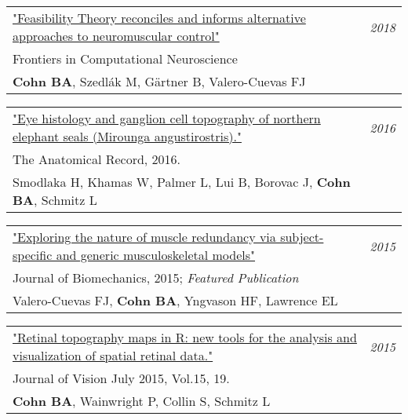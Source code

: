 \documentclass[10pt,a4paper]{article}
\begin{document}
\vspace*{1mm}\noindent\begin{tabularx}{17cm}{X r}
   \href{https://github.com/bc/resume/raw/master/papers/cohn_et_al_2018_frontiers.pdf}{"Feasibility Theory reconciles and informs alternative approaches to neuromuscular control"} & \textit{2018}\\
   Frontiers in Computational Neuroscience \\
	 \textbf{Cohn BA}, Szedl\'{a}k M, G{\"a}rtner B, Valero-Cuevas FJ \\[2mm]
\end{tabularx}


\vspace*{1mm}\noindent\begin{tabularx}{17cm}{X r}
    \href{smodlaka_et_al_2016_the_anatomical_record.pdf}{"Eye histology and ganglion cell topography of northern elephant seals (Mirounga angustirostris)."}  & \textit{2016}\\
    The Anatomical Record, 2016. \\
    Smodlaka H, Khamas W, Palmer L, Lui B, Borovac J, \textbf{Cohn BA}, Schmitz L \\[2mm]
\end{tabularx}

\vspace*{1mm}\noindent\begin{tabularx}{17cm}{X r}
    \href{https://github.com/bc/resume/raw/master/papers/valero_cuevas_2015_job.pdf}{"Exploring the nature of muscle redundancy via subject-specific and generic musculoskeletal models" } & \textit{2015}\\
    Journal of Biomechanics, 2015; \textit{Featured Publication} \\
    Valero-Cuevas FJ, \textbf{Cohn BA}, Yngvason HF, Lawrence EL \\[2mm]
\end{tabularx}


\vspace*{1mm}\noindent\begin{tabularx}{17cm}{X r}
    \href{https://github.com/bc/resume/raw/master/papers/cohn_et_al_2015_jov.pdf}{"Retinal topography maps in R: new tools for the analysis and visualization of spatial retinal data."}  & \textit{2015}\\
    Journal of Vision July 2015, Vol.15, 19. \\
    \textbf{Cohn BA}, Wainwright P, Collin S, Schmitz L \\[2mm]
\end{tabularx}
\end{document}
